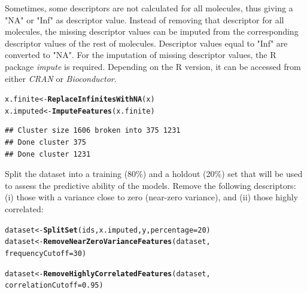 \documentclass[twoside,a4wide,12pt]{article}\usepackage[]{graphicx}\usepackage[]{color}
\makeatletter
\newcommand{\hlnum}[1]{\textcolor[rgb]{0.686,0.059,0.569}{#1}}%
\newcommand{\hlstd}[1]{\textcolor[rgb]{0.345,0.345,0.345}{#1}}%
\newcommand{\hlkwb}[1]{\textcolor[rgb]{0.69,0.353,0.396}{#1}}%
\newcommand{\hlkwc}[1]{\textcolor[rgb]{0.333,0.667,0.333}{#1}}%
\newcommand{\hlkwd}[1]{\textcolor[rgb]{0.737,0.353,0.396}{\textbf{#1}}}%
\newenvironment{kframe}{%
 \def\at@end@of@kframe{}%
 \ifinner\ifhmode%
  \def\at@end@of@kframe{\end{minipage}}%
  \begin{minipage}{\columnwidth}%
 \fi\fi%
 \def\FrameCommand##1{\hskip\@totalleftmargin \hskip-\fboxsep
 \colorbox{shadecolor}{##1}\hskip-\fboxsep
     \hskip-\linewidth \hskip-\@totalleftmargin \hskip\columnwidth}%
 \MakeFramed {\advance\hsize-\width
   \@totalleftmargin\z@ \linewidth\hsize
   \@setminipage}}%
 {\par\unskip\endMakeFramed%
 \at@end@of@kframe}
\newenvironment{knitrout}{}{} %
\makeatother
\begin{document}
Sometimes, some descriptors are not calculated for all molecules, thus giving a "NA" or "Inf" as descriptor value.
Instead of removing that descriptor for all molecules, the missing descriptor values can be imputed from the corresponding descriptor values of the rest of molecules.
Descriptor values equal to "Inf" are converted to "NA".
For the imputation of missing descriptor values, the R package {\it impute} is required.
Depending on the R version, it can be accessed from either {\it CRAN} or {\it Bioconductor}.
\begin{knitrout}
\color{fgcolor}\begin{kframe}
\begin{alltt}
\hlstd{x.finite} \hlkwb{<-} \hlkwd{ReplaceInfinitesWithNA}\hlstd{(x)}
\hlstd{x.imputed} \hlkwb{<-} \hlkwd{ImputeFeatures}\hlstd{(x.finite)}
\end{alltt}


{\ttfamily\noindent\itshape\color{messagecolor}{\#\# Loading required package: impute}}\begin{verbatim}
## Cluster size 1606 broken into 375 1231 
## Done cluster 375 
## Done cluster 1231
\end{verbatim}
\end{kframe}
\end{knitrout}

Split the dataset into a training (80\%) and a holdout (20\%) set that will be used to assess the predictive ability of the models. Remove the following descriptors: (i) those with a variance close to zero (near-zero variance), and (ii) those highly correlated:
\begin{knitrout}
\color{fgcolor}\begin{kframe}
\begin{alltt}
\hlstd{dataset} \hlkwb{<-} \hlkwd{SplitSet}\hlstd{(ids, x.imputed, y,} \hlkwc{percentage} \hlstd{=} \hlnum{20}\hlstd{)}
\hlstd{dataset} \hlkwb{<-} \hlkwd{RemoveNearZeroVarianceFeatures}\hlstd{(dataset,}
    \hlkwc{frequencyCutoff} \hlstd{=} \hlnum{30}\hlstd{)}
\end{alltt}


{\ttfamily\noindent\itshape\color{messagecolor}{\#\# 397 features removed with variance below cutoff}}\begin{alltt}
\hlstd{dataset} \hlkwb{<-} \hlkwd{RemoveHighlyCorrelatedFeatures}\hlstd{(dataset,}
    \hlkwc{correlationCutoff} \hlstd{=} \hlnum{0.95}\hlstd{)}
\end{alltt}


{\ttfamily\noindent\itshape\color{messagecolor}{\#\# 121 features removed with correlation above cutoff}}\end{kframe}
\end{knitrout}
\end{document}
